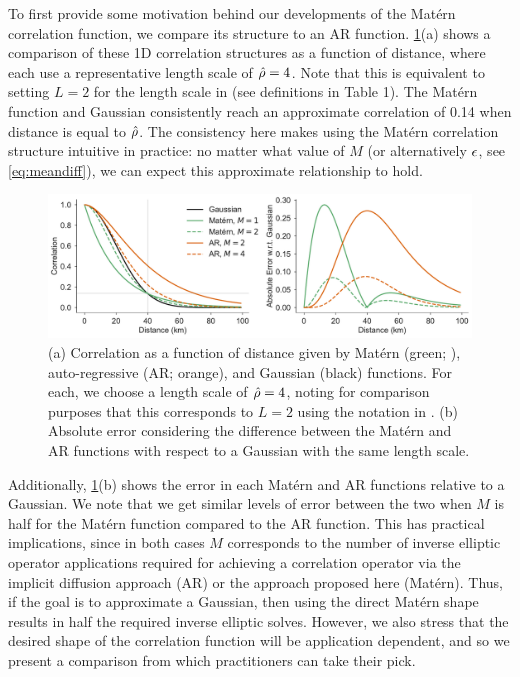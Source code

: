 To first provide some motivation behind our developments of the Mat\'ern
correlation function, we compare its structure to an AR function.
\cref{fig:correlation_comparison}(a) shows a comparison of these 1D correlation
structures as a function of distance, where each use a representative length
scale of $\hat{\rho} = 4$.
Note that this is equivalent to setting $L=2$ for the length scale in
\citet{mirouze_representation_2010} (see definitions in Table 1).
The Mat\'ern function and Gaussian consistently reach an approximate correlation
of 0.14 when distance is equal to $\hat{\rho}$.
The consistency here makes using the Mat\'ern correlation structure intuitive in
practice: no matter what value of $M$ (or alternatively $\epsilon$, see
\cref{eq:meandiff}), we can expect this approximate relationship to hold.


\begin{figure}
    \centering
    \includegraphics[width=\textwidth]{../figures/correlation_comparison.pdf}
    \caption{(a) Correlation as a function of distance given by
        Mat\'ern (green; ),
        auto-regressive (AR; orange),
        and Gaussian (black) functions.
        For each, we choose a length scale of $\hat{\rho} = 4$, noting for
        comparison purposes that this corresponds to $L=2$ using the notation in
        \citet{mirouze_representation_2010}.
        (b) Absolute error considering the difference between the Mat\'ern and
        AR functions with respect to a Gaussian with the same length scale.
    }
    \label{fig:correlation_comparison}
\end{figure}

Additionally, \cref{fig:correlation_comparison}(b) shows the error in each
Mat\'ern and AR functions relative to a Gaussian.
We note that we get similar levels of error between the two when $M$ is half for
the Mat\'ern function compared to the AR function.
This has practical implications, since in both cases $M$ corresponds to the
number of inverse elliptic operator applications required for achieving a
correlation operator via the implicit diffusion approach (AR) or the approach
proposed here (Mat\'ern).
Thus, if the goal is to approximate a Gaussian, then using the direct Mat\'ern
shape results in half the required inverse elliptic solves.
However, we also stress that the desired shape of the correlation function will
be application dependent, and so we present a comparison from which
practitioners can take their pick.
